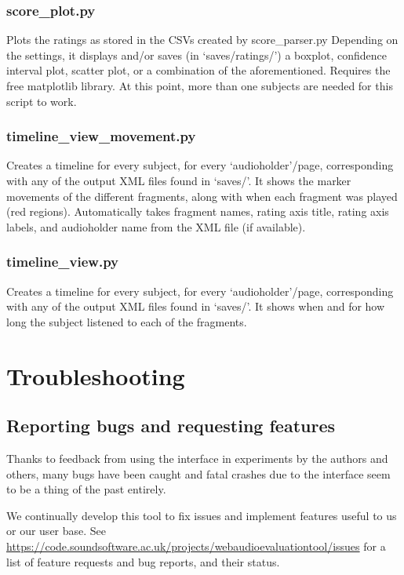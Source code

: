 \documentclass[11pt, oneside]{article}   	%
\begin{document}
		\subsubsection{score\_plot.py}
			Plots the ratings as stored in the CSVs created by score\_parser.py
			Depending on the settings, it displays and/or saves (in `saves/ratings/') a boxplot, confidence interval plot, scatter plot, or a combination of the aforementioned. 
			Requires the free matplotlib library. 
			At this point, more than one subjects are needed for this script to work. 

		\subsubsection{timeline\_view\_movement.py}
			Creates a timeline for every subject, for every `audioholder'/page, corresponding with any of the output XML files found in `saves/'. It shows the marker movements of the different fragments, along with when each fragment was played (red regions). Automatically takes fragment names, rating axis title, rating axis labels, and audioholder name from the XML file (if available). 

		\subsubsection{timeline\_view.py} %
			Creates a timeline for every subject, for every `audioholder'/page, corresponding with any of the output XML files found in `saves/'. It shows when and for how long the subject listened to each of the fragments. 



\clearpage
\section{Troubleshooting} \label{sec:troubleshooting}
	\subsection{Reporting bugs and requesting features}
	Thanks to feedback from using the interface in experiments by the authors and others, many bugs have been caught and fatal crashes due to the interface seem to be a thing of the past entirely. 

	We continually develop this tool to fix issues and implement features useful to us or our user base. See \url{https://code.soundsoftware.ac.uk/projects/webaudioevaluationtool/issues} for a list of feature requests and bug reports, and their status. 
\end{document}
